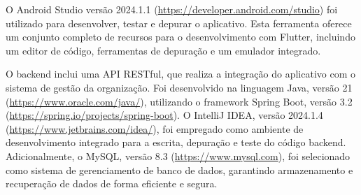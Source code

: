 O Android Studio versão 2024.1.1 (\url{https://developer.android.com/studio}) foi utilizado para desenvolver, testar e depurar o aplicativo. Esta ferramenta oferece um conjunto completo de recursos para o desenvolvimento com Flutter, incluindo um editor de código, ferramentas de depuração e um emulador integrado.


O backend inclui uma API RESTful, que realiza a integração do aplicativo com o sistema de gestão da organização. Foi desenvolvido na linguagem Java, versão 21 (\url{https://www.oracle.com/java/}), utilizando o framework Spring Boot, versão 3.2 (\url{https://spring.io/projects/spring-boot}).
O IntelliJ IDEA, versão 2024.1.4 (\url{https://www.jetbrains.com/idea/}), foi empregado como ambiente de desenvolvimento integrado para a escrita, depuração e teste do código backend. Adicionalmente, o MySQL, versão 8.3 (\url{https://www.mysql.com}), foi selecionado como sistema de gerenciamento de banco de dados, garantindo armazenamento e recuperação de dados de forma eficiente e segura.

